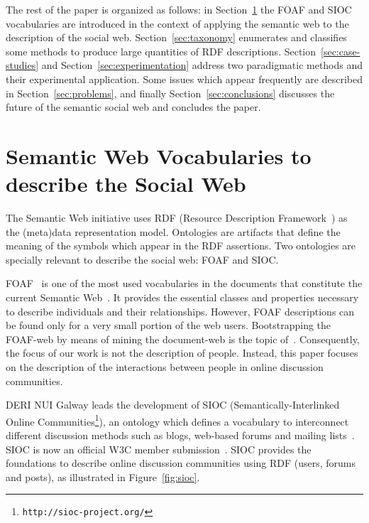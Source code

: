 \documentclass{../templates/www2008-submission}
\begin{document}
The rest of the paper is organized as follows: in Section~\ref{sec:vocabularies}
the FOAF and SIOC vocabularies are introduced in the context of applying
the semantic web to the description of the social web. Section~\ref{sec:taxonomy}
enumerates and classifies some methods to produce large quantities
of RDF descriptions. Section~\ref{sec:case-studies} and
Section~\ref{sec:experimentation} address two paradigmatic methods
and their experimental application. Some issues which appear
frequently are described in Section~\ref{sec:problems}, and
finally Section~\ref{sec:conclusions} discusses the future of the
semantic social web and concludes the paper.


\section{Semantic Web Vocabularies to describe the Social Web}\label{sec:vocabularies}

The Semantic Web initiative uses RDF (Resource Description
Framework~\cite{RDF}) as the (meta)data representation model.
Ontologies are artifacts that define the meaning of the symbols
which appear in the RDF assertions. Two ontologies are
specially relevant to describe the social web: FOAF and SIOC.

FOAF~\cite{FOAF} is one of the most used vocabularies in the documents that
constitute the current Semantic Web~\cite{Ding2005, Finin2005}.
It provides the essential classes and properties necessary
to describe individuals
and their relationships. However, FOAF descriptions can be found
only for a very small portion of the web users. Bootstrapping the
FOAF-web by means of mining the document-web is the topic
of~\cite{Mika2004}. Consequently, the focus of our work is not the
description of people. Instead, this paper focuses on the description
of the interactions between people in online discussion communities.

DERI NUI Galway leads the development of SIOC (Seman\-ti\-cally-Interlinked Online
Communities\footnote{\texttt{http://sioc-project.org/}}), an ontology which 
defines a vocabulary to interconnect different discussion methods such 
as blogs, web-based forums and mailing lists~\cite{Breslin2006,Breslin2005}.
SIOC is now an official W3C member submission~\cite{Bojars2007}.
SIOC provides the foundations to describe online discussion
communities using RDF (users, forums and posts), as illustrated in
Figure~\ref{fig:sioc}.
\end{document}
